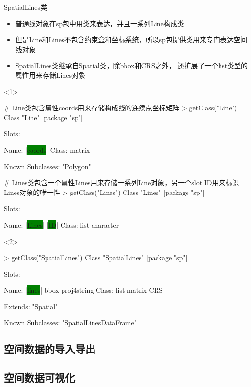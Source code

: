 \begin{frame}[t,fragile]{\subsecname}{SpatialLines类}
\begin{itemize}
\item<1-> 普通线对象在sp包中用类来表达，并且一系列Line构成类
\item<2-> 但是Line和Lines不包含约束盒和坐标系统，所以sp包提供类用来专门表达空间线对象
\item<2-> SpatialLines类继承自Spatial类，除bbox和CRS之外，
还扩展了一个list类型的属性用来存储Lines对象
\end{itemize}

\begin{overlayarea}{\textwidth}{\textheight}
\begin{onlyenv}<1>
\begin{rcode}
# Line类包含属性coords用来存储构成线的连续点坐标矩阵
> getClass("Line")
Class "Line" [package "sp"]

Slots:
             
Name:  |\colorbox{green}{coords}|
Class: matrix

Known Subclasses: "Polygon"

# Lines类包含一个属性Lines用来存储一系列Line对象，另一个slot ID用来标识Lines对象的唯一性
> getClass("Lines")
Class "Lines" [package "sp"]

Slots:
                          
Name:      |\colorbox{green}{Lines}|        |\colorbox{green}{ID}|
Class:      list character
\end{rcode}
\end{onlyenv}

\begin{onlyenv}<2>
\begin{rcode}
> getClass("SpatialLines")
Class "SpatialLines" [package "sp"]

Slots:
                                          
Name:        |\colorbox{green}{lines}|        bbox proj4string
Class:        list      matrix         CRS

Extends: "Spatial"

Known Subclasses: "SpatialLinesDataFrame"
\end{rcode}
\end{onlyenv}
\end{overlayarea}
\end{frame}
\subsection{空间数据的导入导出}

\subsection{空间数据可视化}